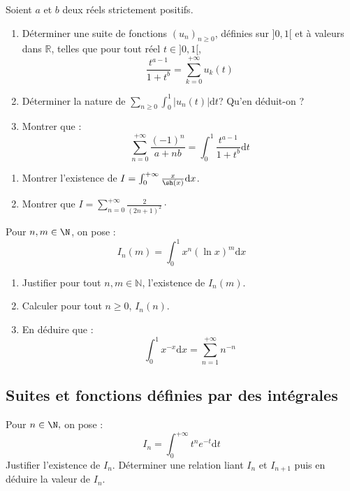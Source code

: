 \documentclass[a4paper,twoside,french,11pt]{VcCours}
\newcommand{\dx}{\text{d}x}
\newcommand{\dt}{\text{d}t}
\begin{document}
\begin{Exercice}{} Soient $a$ et $b$ deux réels strictement positifs.
\begin{enumerate}
\item Déterminer une suite de fonctions $(u_n)_{n \geq 0}$, définies sur $]0,1[$ et à valeurs dans $\mathbb{R}$, telles que pour tout réel $t \in ]0,1[$,
$$ \dfrac{t^{a-1}}{1+t^b} = \sum_{k=0}^{+ \infty} u_k(t)$$
\item Déterminer la nature de $\sum_{n \geq 0} \int_0^1 \vert u_n(t) \vert \dt$? Qu'en déduit-on ?
\item Montrer que :
$$ \sum_{n=0}^{+ \infty} \dfrac{(-1)^n}{a+nb} = \int_0^1 \dfrac{t^{a-1}}{1+t^b} \dt$$
\end{enumerate}
\end{Exercice}

\begin{Exercice}{}\label{gamma}

\begin{enumerate}
\item Montrer l'existence de $I = \int_{0}^{+ \infty} \frac{x}{\sh(x)} \dx$.
\item Montrer que $I= \sum_{n=0}^{+ \infty} \frac{2}{(2n+1)^2}\cdot$
\end{enumerate}
\end{Exercice} 
 
\begin{Exercice}{} Pour $n,m \in \N$, on pose :
  \[
  I_{n}(m) = \int_{0}^{1} x^{n}(\ln x)^{m} \dx
  \]
  \begin{enumerate}
  \item Justifier pour tout $n,m \in \mathbb{N}$, l'existence de $I_n(m)$.
  \item Calculer pour tout $n \geq 0$, $I_{n}(n)$.
  \item
    En déduire que :
    \[
    \int_{0}^{1} x^{ - x} \dx = \sum_{n = 1}^{ + \infty} n^{ - n}
    \]
  \end{enumerate}
\end{Exercice}

\subsection{Suites et fonctions définies par des intégrales}

\begin{Exercice}{} Pour $n\in\N,$ on pose :
$$I_n=\int_0^{+\infty} t^ne^{-t} \dt$$
Justifier l'existence de $I_n$. Déterminer une relation liant $I_n$ et $I_{n+1}$ puis en déduire la valeur de $I_n.$
\end{Exercice} 
\end{document}
